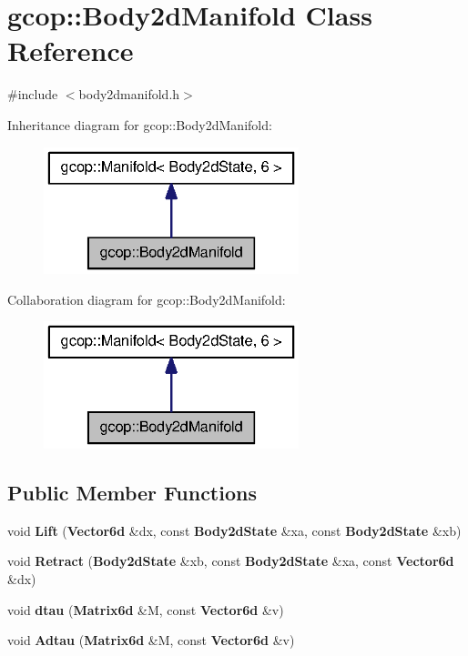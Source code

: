 \section{gcop\-:\-:\-Body2d\-Manifold \-Class \-Reference}
\label{classgcop_1_1Body2dManifold}


{\ttfamily \#include $<$body2dmanifold.\-h$>$}



\-Inheritance diagram for gcop\-:\-:\-Body2d\-Manifold\-:
\nopagebreak
\begin{figure}[H]
\begin{center}
\leavevmode
\includegraphics[width=210pt]{classgcop_1_1Body2dManifold__inherit__graph}
\end{center}
\end{figure}


\-Collaboration diagram for gcop\-:\-:\-Body2d\-Manifold\-:
\nopagebreak
\begin{figure}[H]
\begin{center}
\leavevmode
\includegraphics[width=210pt]{classgcop_1_1Body2dManifold__coll__graph}
\end{center}
\end{figure}
\subsection*{\-Public \-Member \-Functions}
\begin{DoxyCompactItemize}
\item 
void {\bf \-Lift} ({\bf \-Vector6d} \&dx, const {\bf \-Body2d\-State} \&xa, const {\bf \-Body2d\-State} \&xb)
\item 
void {\bf \-Retract} ({\bf \-Body2d\-State} \&xb, const {\bf \-Body2d\-State} \&xa, const {\bf \-Vector6d} \&dx)
\item 
void {\bf dtau} ({\bf \-Matrix6d} \&\-M, const {\bf \-Vector6d} \&v)
\item 
void {\bf \-Adtau} ({\bf \-Matrix6d} \&\-M, const {\bf \-Vector6d} \&v)
\end{DoxyCompactItemize}
